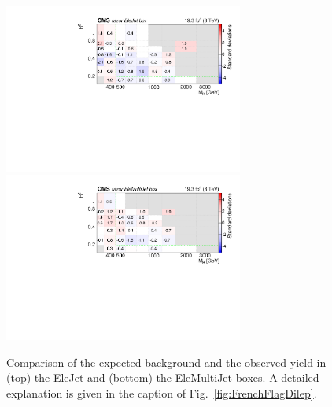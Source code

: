\begin{figure}[tb!]
\end{figure}

\begin{figure}[tb!]
\centering
\includegraphics[width=0.7\textwidth]{figs/analysis8TeV/nSigmaLog_EleJet.pdf}
\includegraphics[width=0.7\textwidth]{figs/analysis8TeV/nSigmaLog_EleMultiJet.pdf}
\caption{Comparison of the expected background and the observed yield
  in (top) the EleJet and (bottom) the EleMultiJet boxes. A detailed explanation is given in the caption of
  Fig.~\ref{fig:FrenchFlagDilep}.\label{fig:FrenchFlagEle}}
\end{figure}


